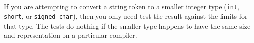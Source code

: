 {{}\hlstd{\hlstd{\ \ }}\hlsym{\}\\
}\hlsym{\hlstd{\ \ }}\hlstd{}\hlstd{}\hlsym{(}\hlsym{[}\hlstd{}\hlstd{}\hlsym{])\ \{\\
}\hlsym{\hlstd{\ \ \ \ }}\hlsym{(}\hlstd{}\hlstd{}\hlsym{)}\hlstd{;\\
}\hlstd{\hlstd{\ \ }}\hlsym{\}\\
}\hlsym{\hlstd{\ \ }}\hlstd{}\hlstd{}\hlsym{(}\hlstd{}\hlsym{)\ \{\\
}\hlsym{\hlstd{\ \ \ \ }}\hlsym{(}\hlstd{}\hlstd{}\hlsym{)}\hlstd{;\\
}\hlstd{\hlstd{\ \ }}\hlsym{\}\\
}\hlsym{\hlstd{\ \ }}\hlstd{}\hlstd{}\hlsym{\{\\
}\hlsym{\hlstd{\ \ \ \ }}\hlsym{(}\hlstd{}\hlstd{}\hlsym{)}\hlstd{\hlstd{\ \ }}\hlsym{\}\\
}\hlsym{\}\\
}\hlsym{}\hlstd{}\\
\mbox{}\\
\normalfont






























}


   If you are attempting to convert a string token to a smaller integer type ({\tt int}, {\tt short}, or {\tt signed char}), then you only need test the result against the limits for that type. The tests do nothing if the smaller type happens to have the same size and representation on a particular compiler.
